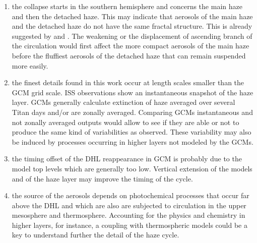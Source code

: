 \begin{enumerate}
\item the collapse starts in the southern hemisphere and concerns the main haze and then the detached haze. This
may indicate that aerosols of the main haze and the detached haze do not have the same fractal structure. This is
already suggested by \cite{Lavvas2009} and \cite{Larson2015}.
The weakening or the displacement of ascending branch of the circulation would first affect the more
compact aerosols of the main haze before the fluffiest aerosols of the detached haze that can remain suspended more
easily.
\item the finest details found in this work occur at length scales smaller than the GCM grid scale.
ISS observations show an instantaneous snapshot of the haze layer. GCMs generally
calculate extinction of haze averaged over several Titan days and/or are zonally averaged. Comparing GCMs instantaneous and
not zonally averaged outputs would allow to see if they are able or not to produce the same kind of variabilities as
observed. These variability may also be induced by processes occurring in higher layers not modeled by the GCMs.
\item the timing offset of the DHL reappearance in GCM is probably due to the model top levels which are generally too
low. Vertical extension of the models and of the haze layer may improve the timing of the cycle.
\item the source of the aerosols depends on photochemical processes that occur far above the DHL and which are
also are subjected to circulation in the upper mesosphere and thermosphere.
Accounting for the physics and chemistry in higher layers, for instance, a coupling with thermospheric models could
be a key to understand further the detail of the haze cycle.
\end{enumerate}